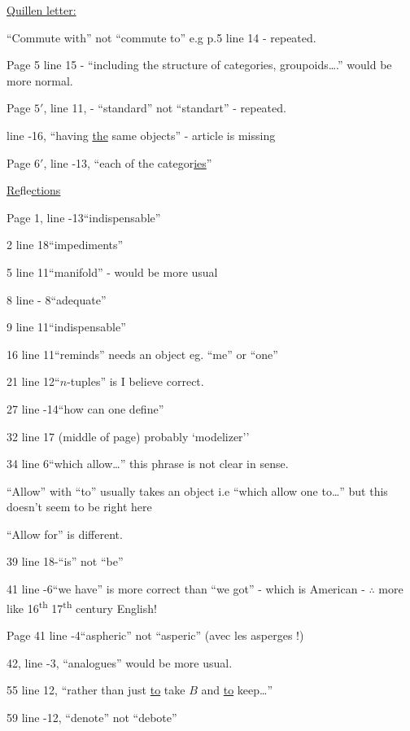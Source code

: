 \uline{Quillen letter:}

``Commute with'' not ``commute to'' e.g p.5 line 14 - repeated.

Page 5 line 15 - ``including the structure of categories, groupoids\ldots.'' would be more normal.

Page $5'$, line 11, - ``standard'' not ``standart'' - repeated.

line -16, ``having \uline{the} same objects'' - article is missing

Page $6'$, line -13, ``each of the categor\uline{ies}''

\uline{Re}fle\uline{ctions}

Page 1, line -13\quad ``indispensable''

2 line 18\quad ``impediments''

5 line 11\quad ``manifold'' - would be more usual

8 line - 8\quad ``adequate''

9 line 11\quad ``indispensable''

16 line 11\quad ``reminds'' needs an object eg. ``me'' or ``one''

21 line 12\quad ``$n$-tuples'' is I believe correct.

27 line -14\quad ``how can one define''

32 line 17 (middle of page) probably `modelizer''

34 line 6\quad ``which allow\ldots'' this phrase is not clear in sense.

``Allow'' with ``to'' usually takes an object i.e ``which allow one to\ldots'' but this doesn't seem to be right here

``Allow for'' is different.

39 line 18-``is'' not ``be''

41 line -6\quad ``we have'' is more correct than ``we got'' - which is American - $\therefore$ more like 16\textsuperscript{th}  17\textsuperscript{th} century English!

Page 41 \unsure{-}line -4\quad ``aspheric'' not ``asperic'' (avec\unsure{,|-} les asperges !)

42, line -3, ``analogues'' would be more usual.

55 line 12, ``rather than just \uline{to} take $B$ and \uline{to} keep\ldots''

59 line -12, ``denote'' not ``debote''

